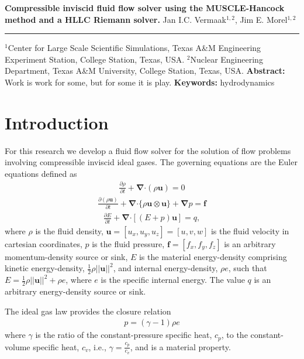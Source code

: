 \documentclass[10pt,letterpaper,notitlepage]{article}
\numberwithin{equation}{section}
\newcommand{\DOCTITLE}{Compressible inviscid fluid flow solver using the MUSCLE-Hancock method and a HLLC Riemann solver.}
\newcommand{\partialderiv}[2]{\frac{\partial #1}{\partial #2}}
\newcommand{\bnabla}{\boldsymbol{\nabla}}
\newcommand{\velocity}{\mathbf{u}}
\newcommand{\dotp}{\boldsymbol{\cdot}}
\newcommand{\beqn}{\begin{equation}\begin{aligned}}
\newcommand{\eeqn}{\end{aligned}\end{equation}}
\begin{document}
\noindent
{\LARGE\textbf{\DOCTITLE}}
\newline
\newline
\newline
\noindent
{\Large Jan I.C. Vermaak$^{1,2}$, Jim E. Morel$^{1,2}$}
\newline
\noindent\rule{\textwidth}{1pt}
{\small $^1$Center for Large Scale Scientific Simulations, Texas A\&M Engineering Experiment Station, College Station, Texas, USA.}
\newline\noindent
{\small $^2$Nuclear Engineering Department, Texas A\&M University, College Station, Texas, USA.}
\newline
\newline
\textbf{Abstract:}\newline\noindent
Work is work for some, but for some it is play.
\newline
\newline\noindent
{\small
\textbf{Keywords:} hydrodynamics}

\section{Introduction}
For this research we develop a fluid flow solver for the solution of flow problems involving compressible inviscid ideal gases. The governing equations are the Euler equations defined as
\beqn 
\partialderiv{\rho}{t} + \bnabla \dotp (\rho \velocity) = 0
\eeqn 
\beqn 
\partialderiv{(\rho\velocity)}{t} + \bnabla \dotp \{ \rho \velocity \otimes \velocity\}  + \bnabla p = \mathbf{f}
\eeqn 
\beqn 
\partialderiv{E}{t} + \bnabla \dotp [(E + p)\velocity] = q,
\eeqn 
where $\rho$ is the fluid density, $\velocity = [u_x, u_y, u_z] =[u,v,w]$ is the fluid velocity in cartesian coordinates, $p$ is the fluid pressure, $\mathbf{f} = [f_x,f_y,f_z]$ is an arbitrary momentum-density source or sink, $E$ is the material energy-density comprising kinetic energy-density, $\frac{1}{2} \rho ||\velocity||^2$, and internal energy-density, $\rho e$, such that $E = \frac{1}{2} \rho ||\velocity||^2 + \rho e$, where $e$ is the specific internal energy. The value $q$ is an arbitrary energy-density source or sink.

The ideal gas law provides the closure relation
\beqn 
p = (\gamma - 1) \rho e
\eeqn 
where $\gamma$ is the ratio of the constant-pressure specific heat, $c_p$, to the constant-volume specific heat, $c_v$, i.e., $\gamma = \frac{c_p}{c_v}$, and is a material property.

\vspace{1cm}
\end{document}
